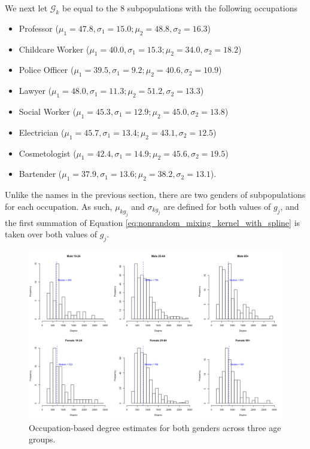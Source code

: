 We next let $\mathcal{G}_k$ be equal to the 8 subpopulations with the following occupations
\begin{itemize}
\item Professor ($\mu_1 = 47.8, \sigma_1 = 15.0;  \mu_2 = 48.8, \sigma_2 = 16.3$)
\item Childcare Worker ($\mu_1 = 40.0, \sigma_1 = 15.3; \mu_2 = 34.0, \sigma_2 = 18.2$)
\item Police Officer ($\mu_1 = 39.5, \sigma_1 = 9.2; \mu_2 = 40.6, \sigma_2 = 10.9$)
\item Lawyer ($\mu_1 = 48.0, \sigma_1 = 11.3; \mu_2 = 51.2, \sigma_2 = 13.3$)
\item Social Worker ($\mu_1 = 45.3, \sigma_1 = 12.9; \mu_2 = 45.0, \sigma_2 = 13.8$)
\item Electrician ($\mu_1 = 45.7, \sigma_1 = 13.4; \mu_2 = 43.1, \sigma_2 = 12.5$)
\item Cosmetologist ($\mu_1 =  42.4, \sigma_1 = 14.9; \mu_2 = 45.6, \sigma_2 = 19.5$)
\item Bartender ($\mu_1 = 37.9, \sigma_1 = 13.6; \mu_2 = 38.2, \sigma_2 = 13.1$).
\end{itemize}
Unlike the names in the previous section, there are two genders of subpopulations for each occupation. As such, $\mu_{kg_j}$ and $\sigma_{kg_j}$ are defined for both values of $g_j$, and the first summation of Equation \ref{eq:nonrandom_mixing_kernel_with_spline} is taken over both values of $g_j$. 

\begin{figure}
\includegraphics[width=\textwidth]{figures/kernel/occs/deg_sexage.png}
\caption{Occupation-based degree estimates for both genders across three age groups. }
\label{fig:occs_degree_sexage}
\end{figure}

